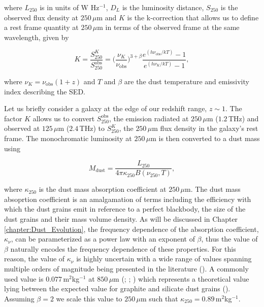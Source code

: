 \noindent where $L_{250}$ is in units of W Hz$^{-1}$, $D_L$ is the luminosity distance, $S_{250}$ is the observed flux density at $250\,\mu$m and $K$ is the k-correction that allows us to define a rest frame quantity at $250\,\mu$m in terms of the observed frame at the same wavelength, given by

\begin{equation}
    K = \frac{S_{250}^{K}}{S_{250}^{\textrm{obs}}} = \Bigg(\frac{\nu_{K}}{\nu_{\textrm{obs}}}\Bigg)^{3+\beta}\frac{e^{(h\nu_{\textrm{obs}}/kT)} - 1}{e^{(h\nu_{K}/kT)} - 1},
\label{eq:k_correction}
\end{equation}

\noindent where $\nu_{K} = \nu_{\textrm{obs}}(1+z)$ and $T$ and $\beta$ are the dust temperature and emissivity index describing the SED. 

Let us briefly consider a galaxy at the edge of our redshift range, $z \sim 1$. The factor $K$ allows us to convert $S_{250}^{\textrm{obs}}$, the emission radiated at $250\,\mu$m ($1.2\,$THz) and observed at $125\,\mu$m ($2.4\,$THz) to $S_{250}^{K}$, the $250\,\mu$m flux density in the galaxy's rest frame. The monochromatic luminosity at $250\,\mu$m is then converted to a dust mass using

\begin{equation}
    M_{\textrm{dust}} = \frac{L_{250}}{4\pi\kappa_{250}B(\nu_{250}, T)},
\label{fig:dust_mass}
\end{equation}

\noindent where $\kappa_{250}$ is the dust mass absorption coefficient at $250\,\mu$m. The dust mass absoprtion coefficient is an amalgamation of terms including the efficiency with which the dust grains emit in reference to a perfect blackbody, the size of the dust grains and their mass volume density. As will be discussed in Chapter \ref{chapter:Dust_Evolution}, the frequency dependence of the absorption coefficient, $\kappa_\nu$, can be parameterized as a power law with an exponent of $\beta$, thus the value of $\beta$ naturally encodes the frequency dependence of these properties. For this reason, the value of $\kappa_\nu$ is highly uncertain with a wide range of values spanning multiple orders of magnitude being presented in the literature (\citealt{Clark_2019}). A commonly used value is $0.077\,$m$^2$kg$^{-1}$ at $850\,\mu$m (\citealt{Dunne_2000}; \citealt{daCunha_2008}; \citealt{Dunne_2011}) which represents a theoretical value lying between the expected value for graphite and silicate dust grains (\citealt{Draine_1984}). Assuming $\beta = 2$ we scale this value to $250\,\mu$m such that $\kappa_{250} = 0.89\,$m$^2$kg$^{-1}$.


